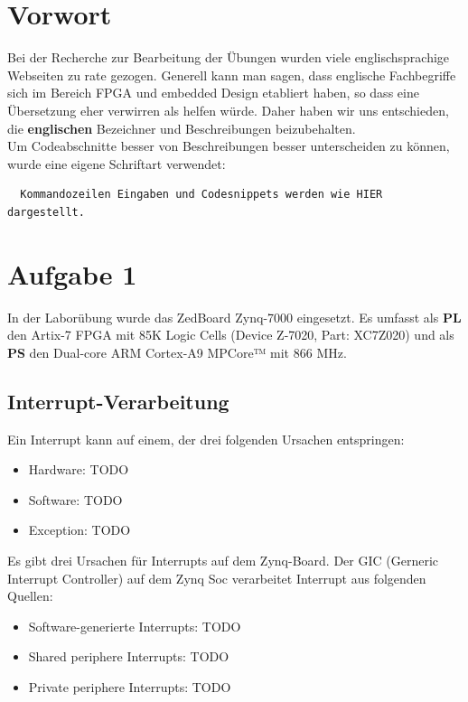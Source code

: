 \section{Vorwort}
Bei der Recherche zur Bearbeitung der Übungen wurden viele englischsprachige Webseiten zu rate gezogen. Generell kann man sagen, dass englische Fachbegriffe sich im Bereich FPGA und embedded Design etabliert haben, so dass eine Übersetzung eher verwirren als helfen würde. Daher haben wir uns entschieden, die \textbf{englischen} Bezeichner und Beschreibungen beizubehalten.\\
Um Codeabschnitte besser von Beschreibungen besser unterscheiden zu können, wurde eine eigene Schriftart verwendet:
\begin{verbatim}
  Kommandozeilen Eingaben und Codesnippets werden wie HIER dargestellt.
\end{verbatim}

\section{Aufgabe 1} \label{ex1}
In der Laborübung wurde das ZedBoard Zynq-7000 eingesetzt. Es umfasst als \textbf{PL} den Artix-7 FPGA mit 85K Logic Cells (Device Z-7020, Part: XC7Z020) und als \textbf{PS} den Dual-core ARM Cortex-A9 MPCore™ mit 866 MHz.

\subsection{Interrupt-Verarbeitung}
Ein Interrupt kann auf einem, der drei folgenden Ursachen entspringen:
\begin{itemize}
  \item Hardware: TODO
  \item Software: TODO
  \item Exception: TODO
\end{itemize}

Es gibt drei Ursachen für Interrupts auf dem Zynq-Board. 
Der GIC (Gerneric Interrupt Controller) auf dem Zynq Soc verarbeitet Interrupt aus folgenden Quellen:
\begin{itemize}
  \item Software-generierte Interrupts: TODO
  \item Shared periphere Interrupts: TODO
  \item Private periphere Interrupts: TODO
\end{itemize}


